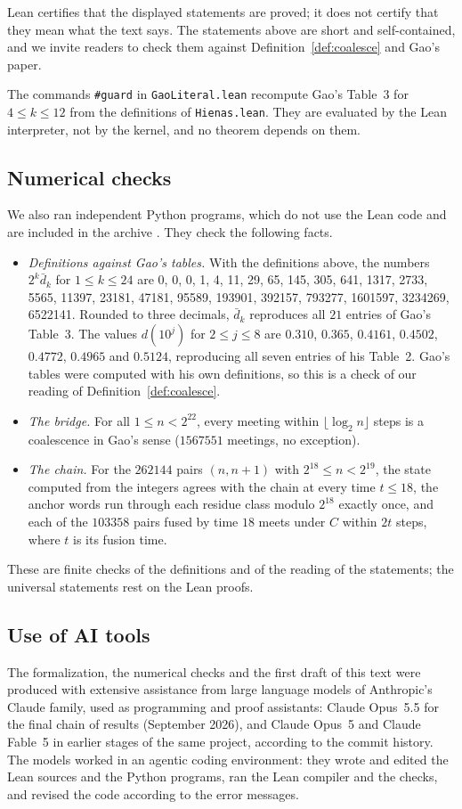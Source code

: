 \documentclass[11pt]{amsart}
\theoremstyle{definition}
\theoremstyle{remark}
\newcommand{\dbar}{\bar d}
\newcommand{\lean}[1]{\nolinkurl{#1}}
\begin{document}
Lean certifies that the displayed statements are proved; it does not certify that they mean what the text says. The statements above are short and self-contained, and we invite readers to check them against Definition~\ref{def:coalesce} and Gao's paper.

The commands \texttt{\#guard} in \lean{GaoLiteral.lean} recompute Gao's Table~3 for $4\le k\le 12$ from the definitions of \lean{Hienas.lean}. They are evaluated by the Lean interpreter, not by the kernel, and no theorem depends on them.

\subsection{Numerical checks}
We also ran independent Python programs, which do not use the Lean code and are included in the archive \cite{Artifact}. They check the following facts.
\begin{itemize}
\item \emph{Definitions against Gao's tables.} With the definitions above, the numbers $2^k\dbar_k$ for $1\le k\le 24$ are
0, 0, 0, 1, 4, 11, 29, 65, 145, 305, 641, 1317, 2733, 5565, 11397, 23181, 47181, 95589, 193901, 392157, 793277, 1601597, 3234269, 6522141.
Rounded to three decimals, $\dbar_k$ reproduces all $21$ entries of Gao's Table~3. The values $d(10^j)$ for $2\le j\le 8$ are $0.310$, $0.365$, $0.4161$, $0.4502$, $0.4772$, $0.4965$ and $0.5124$, reproducing all seven entries of his Table~2. Gao's tables were computed with his own definitions, so this is a check of our reading of Definition~\ref{def:coalesce}.
\item \emph{The bridge.} For all $1\le n<2^{22}$, every meeting within $\lfloor\log_2 n\rfloor$ steps is a coalescence in Gao's sense ($1567551$ meetings, no exception).
\item \emph{The chain.} For the $262144$ pairs $(n,n+1)$ with $2^{18}\le n<2^{19}$, the state computed from the integers agrees with the chain at every time $t\le18$, the anchor words run through each residue class modulo $2^{18}$ exactly once, and each of the $103358$ pairs fused by time $18$ meets under $C$ within $2t$ steps, where $t$ is its fusion time.
\end{itemize}
These are finite checks of the definitions and of the reading of the statements; the universal statements rest on the Lean proofs.

\subsection{Use of AI tools}\label{sec:ai}
The formalization, the numerical checks and the first draft of this text were produced with extensive assistance from large language models of Anthropic's Claude family, used as programming and proof assistants: Claude Opus~5.5 for the final chain of results (September 2026), and Claude Opus~5 and Claude Fable~5 in earlier stages of the same project, according to the commit history. The models worked in an agentic coding environment: they wrote and edited the Lean sources and the Python programs, ran the Lean compiler and the checks, and revised the code according to the error messages.
\end{document}
